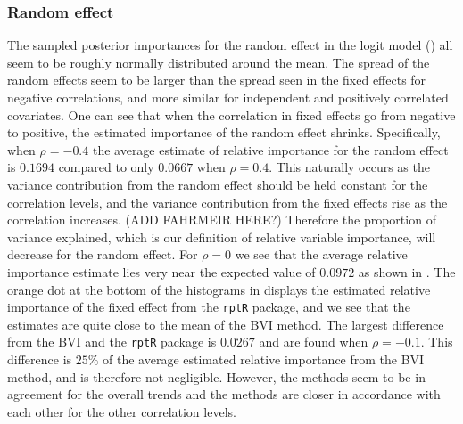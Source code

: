 \subsubsection{Random effect}
The sampled posterior importances for the random effect in the logit model () all seem to be roughly normally distributed around the mean. The spread of the random effects seem to be larger than the spread seen in the fixed effects for negative correlations, and more similar for independent and positively correlated covariates. One can see that when the correlation in fixed effects go from negative to positive, the estimated importance of the random effect shrinks. Specifically, when $\rho=-0.4$ the average estimate of relative importance for the random effect is $0.1694$ compared to only $0.0667$ when $\rho=0.4$. This naturally occurs as the variance contribution from the random effect should be held constant for the correlation levels, and the variance contribution from the fixed effects rise as the correlation increases. (ADD FAHRMEIR HERE?) Therefore the proportion of variance explained, which is our definition of relative variable importance, will decrease for the random effect. For $\rho=0$ we see that the average relative importance estimate lies very near the expected value of $0.0972$ as shown in . The orange dot at the bottom of the histograms in  displays the estimated relative importance of the fixed effect from the \texttt{rptR} package, and we see that the estimates are quite close to the mean of the BVI method. The largest difference from the BVI and the \texttt{rptR} package is $0.0267$ and are found when $\rho=-0.1$. This difference is $25\%$ of the average estimated relative importance from the BVI method, and is therefore not negligible. However, the methods seem to be in agreement for the overall trends and the methods are closer in accordance with each other for the other correlation levels.
\\
\\
